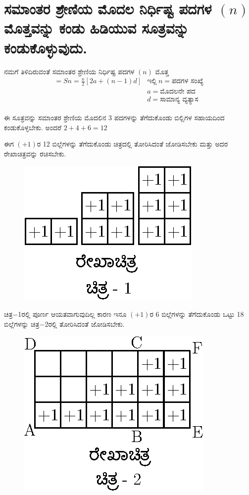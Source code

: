 \section*{ಸಮಾಂತರ ಶ್ರೇಣಿಯ ಮೊದಲ ನಿರ್ಧಿಷ್ಟ ಪದಗಳ $(n)$ ಮೊತ್ತವನ್ನು ಕಂಡು ಹಿಡಿಯುವ ಸೂತ್ರವನ್ನು ಕಂಡುಕೊಳ್ಳುವುದು.}

ನಮಗೆ ತಿಳಿದಿರುವಂತೆ ಸಮಾಂತರ ಶ್ರೇಣಿಯ ನಿರ್ಧಿಷ್ಟ ಪದಗಳ $(n)$ ಮೊತ್ತ 
\begin{align*}
= Sn = \frac{n}{2} [2a + (n-1) d] & \text{ಇಲ್ಲಿ}~ n = \text{ಪದಗಳ ಸಂಖ್ಯೆ}\\
& a = \text{ಮೊದಲನೇ ಪದ}\\
& d = \text{ಸಾಮಾನ್ಯ ವ್ಯತ್ಯಾಸ}
\end{align*}

ಈ ಸೂತ್ರವನ್ನು ಸಮಾಂತರ ಶ್ರೇಣಿಯ ಮೊದಲಿನ 3 ಪದಗಳನ್ನು ತೆಗೆದುಕೊಂಡು ಬಿಲ್ಲಿಗಳ ಸಹಾಯದಿಂದ ಕಂಡುಕೊಳ್ಳಬೇಕು. ಅಂದರೆ $2 + 4 + 6 = 12$

ಈಗ $(+1)$ರ 12 ಬಿಲ್ಲೆಗಳನ್ನು ತೆಗೆದುಕೊಂಡು ಚಿತ್ರದಲ್ಲಿ ತೋರಿಸಿದಂತೆ ಜೋಡಿಸ\-ಬೇಕು ಮತ್ತು ಅದರ ರೇಖಾಚಿತ್ರವನ್ನು ರಚಿಸಬೇಕು.
\begin{figure}[H]
\centering
\includegraphics{src/figure/chap3/fig3-56a.eps}
\end{figure}

ಚಿತ್ರ$-$1ರಲ್ಲಿ ಪೂರ್ಣ ಆಯತವಾಗುವುದಿಲ್ಲ ಕಾರಣ ಇನೂ $(+1)$ರ 6 ಬಿಲ್ಲೆಗಳನ್ನು ತೆಗೆದುಕೊಂಡು ಒಟ್ಟು 18 ಬಿಲ್ಲೆಗಳನ್ನು ಚಿತ್ರ$-$2ರಲ್ಲಿ ತೋರಿಸಿದಂತೆ ಜೋಡಿಸಬೇಕು. 
\begin{figure}[H]
\centering
\includegraphics{src/figure/chap3/fig3-56b.eps}
\end{figure}

